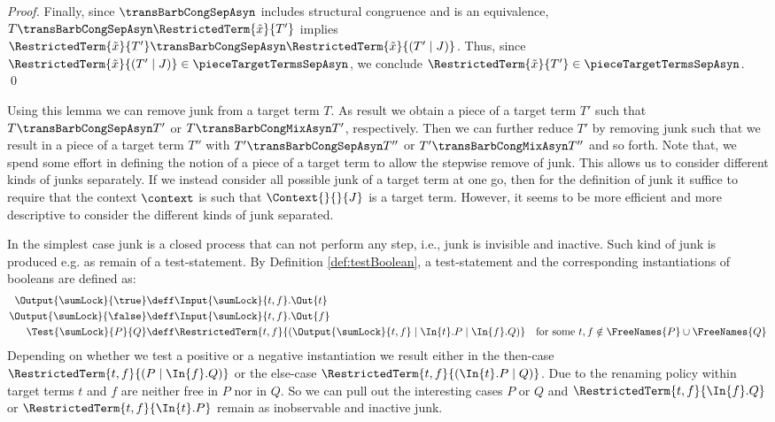 \documentclass[]{llncs}
\begin{document}
\begin{proof}
	Finally, since $ \transBarbCongSepAsyn $ includes structural congruence and is an equivalence, $ T \transBarbCongSepAsyn \RestrictedTerm{\tilde{x}}{T'} $ implies $ \RestrictedTerm{\tilde{x}}{T'} \transBarbCongSepAsyn \RestrictedTerm{\tilde{x}}{\left( T' \mid J \right)} $. Thus, since $ \RestrictedTerm{\tilde{x}}{\left( T' \mid J \right)} \in \pieceTargetTermsSepAsyn $, we conclude $ \RestrictedTerm{\tilde{x}}{T'} \in \pieceTargetTermsSepAsyn $.
	\qed
\end{proof}

Using this lemma we can remove junk from a target term $ T $. As result we obtain a piece of a target term $ T' $ such that $ T \transBarbCongSepAsyn T' $ or $ T \transBarbCongMixAsyn T' $, respectively. Then we can further reduce $ T' $ by removing junk such that we result in a piece of a target term $ T'' $ with $ T' \transBarbCongSepAsyn T'' $ or $ T' \transBarbCongMixAsyn T'' $ and so forth. Note that, we spend some effort in defining the notion of a piece of a target term to allow the stepwise remove of junk. This allows us to consider different kinds of junks separately. If we instead consider all possible junk of a target term at one go, then for the definition of junk it suffice to require that the context $ \context $ is such that $ \Context{}{}{J} $ is a target term. However, it seems to be more efficient and more descriptive to consider the different kinds of junk separated.

In the simplest case junk is a closed process that can not perform any step, i.e., junk is invisible and inactive. Such kind of junk is produced e.g. as remain of a test-statement. By Definition \ref{def:testBoolean}, a test-statement and the corresponding instantiations of booleans are defined as:
\begin{align*}
	\Output{\sumLock}{\true} & \deff \Input{\sumLock}{t, f}.\Out{t}\\
	\Output{\sumLock}{\false} & \deff \Input{\sumLock}{t, f}.\Out{f}\\
	\Test{\sumLock}{P}{Q} & \deff \RestrictedTerm{t, f}{\left( \Output{\sumLock}{t, f} \mid \In{t}.P \mid \In{f}.Q \right)} \quad \text{for some } t, f \notin \FreeNames{P} \cup \FreeNames{Q}
\end{align*}
Depending on whether we test a positive or a negative instantiation we result either in the then-case $ \RestrictedTerm{t, f}{\left( P \mid \In{f}.Q \right)} $ or the else-case $ \RestrictedTerm{t, f}{\left( \In{t}.P \mid Q \right)} $. Due to the renaming policy within target terms $ t $ and $ f $ are neither free in $ P $ nor in $ Q $. So we can pull out the interesting cases $ P $ or $ Q $ and $ \RestrictedTerm{t, f}{\In{f}.Q} $ or $ \RestrictedTerm{t, f}{\In{t}.P} $ remain as inobservable and inactive junk.
\end{document}
